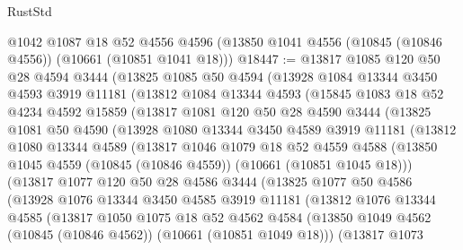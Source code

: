 \begin{lexlean}{RustStd}
\begin{coremodule}
    @1042
    @1087
    @18
    @52
    @4556
    @4596
    (@13850 @1041 @4556 (@10845 (@10846 @4556)) (@10661 (@10851 @1041 @18)))
@18447 := @13817
    @1085
    @120
    @50
    @28
    @4594
    @3444
    (@13825
      @1085
      @50
      @4594
      (@13928
        @1084
        @13344
        @3450
        @4593
        @3919
        @11181
        (@13812
          @1084
          @13344
          @4593
          (@15845
            @1083
            @18
            @52
            @4234
            @4592
            @15859
            (@13817
              @1081
              @120
              @50
              @28
              @4590
              @3444
              (@13825
                @1081
                @50
                @4590
                (@13928
                  @1080
                  @13344
                  @3450
                  @4589
                  @3919
                  @11181
                  (@13812
                    @1080
                    @13344
                    @4589
                    (@13817
                      @1046
                      @1079
                      @18
                      @52
                      @4559
                      @4588
                      (@13850 @1045 @4559 (@10845 (@10846 @4559)) (@10661 (@10851 @1045 @18)))
                      (@13817
                        @1077
                        @120
                        @50
                        @28
                        @4586
                        @3444
                        (@13825
                          @1077
                          @50
                          @4586
                          (@13928
                            @1076
                            @13344
                            @3450
                            @4585
                            @3919
                            @11181
                            (@13812
                              @1076
                              @13344
                              @4585
                              (@13817
                                @1050
                                @1075
                                @18
                                @52
                                @4562
                                @4584
                                (@13850
                                  @1049
                                  @4562
                                  (@10845 (@10846 @4562))
                                  (@10661 (@10851 @1049 @18)))
                                (@13817
                                  @1073

\end{coremodule}
\end{lexlean}
